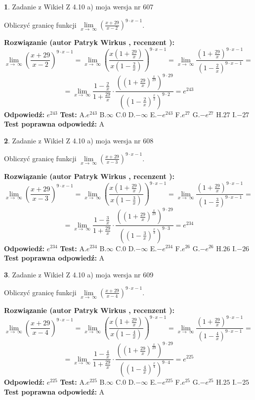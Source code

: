 \documentclass[12pt, a4paper]{article}
\theoremstyle{definition} %
\newtheorem{zad}{}
\newcommand{\zadStart}[1]{\begin{zad}#1\newline}
\newcommand{\zadStop}{\end{zad}}
\newcommand{\rozwStart}[2]{\noindent \textbf{Rozwiązanie (autor #1 , recenzent #2): }\newline}
\newcommand{\rozwStop}{\newline}
\newcommand{\odpStart}{\noindent \textbf{Odpowiedź:}\newline}
\newcommand{\odpStop}{\newline}
\newcommand{\testStart}{\noindent \textbf{Test:}\newline}
\newcommand{\testStop}{\newline}
\newcommand{\kluczStart}{\noindent \textbf{Test poprawna odpowiedź:}\newline}
\newcommand{\kluczStop}{\newline}
\begin{document}
\zadStart{Zadanie z Wikieł Z 4.10 a) moja wersja nr 607}

Obliczyć granicę funkcji  $\lim\limits_{x\to\ \infty}(\frac{x+29}{x-2})^{9\cdot x-1}$.
\zadStop
\rozwStart{Patryk Wirkus}{}
$$\lim\limits_{x\to\ \infty}(\frac{x+29}{x-2})^{9\cdot x-1} = \lim\limits_{x\to\ \infty}(\frac{x(1+\frac{29}{x})}{x(1-\frac{2}{x})})^{9\cdot x-1}=\lim\limits_{x\to\ \infty}\frac{(1+\frac{29}{x})^{9\cdot x-1}}{(1-\frac{2}{x})^{9\cdot x-1}}=$$
$$=\lim\limits_{x\to\ \infty}\frac{1-\frac{2}{x}}{1+\frac{29}{x}}\cdot\frac{((1+\frac{29}{x})^{\frac{x}{29}})^{9\cdot29}}{((1-\frac{2}{x})^{\frac{x}{2}})^{9\cdot2}}=e^{243}$$
\rozwStop
\odpStart
$e^{243}$
\odpStop
\testStart
A.$e^{243}$ B.$\infty$ C.$0$ D.$-\infty$ E.$-e^{243}$
F.$e^{27}$ G.$-e^{27}$
H.$27$
I.$-27$
\testStop
\kluczStart
A
\kluczStop



\zadStart{Zadanie z Wikieł Z 4.10 a) moja wersja nr 608}

Obliczyć granicę funkcji  $\lim\limits_{x\to\ \infty}(\frac{x+29}{x-3})^{9\cdot x-1}$.
\zadStop
\rozwStart{Patryk Wirkus}{}
$$\lim\limits_{x\to\ \infty}(\frac{x+29}{x-3})^{9\cdot x-1} = \lim\limits_{x\to\ \infty}(\frac{x(1+\frac{29}{x})}{x(1-\frac{3}{x})})^{9\cdot x-1}=\lim\limits_{x\to\ \infty}\frac{(1+\frac{29}{x})^{9\cdot x-1}}{(1-\frac{3}{x})^{9\cdot x-1}}=$$
$$=\lim\limits_{x\to\ \infty}\frac{1-\frac{3}{x}}{1+\frac{29}{x}}\cdot\frac{((1+\frac{29}{x})^{\frac{x}{29}})^{9\cdot29}}{((1-\frac{3}{x})^{\frac{x}{3}})^{9\cdot3}}=e^{234}$$
\rozwStop
\odpStart
$e^{234}$
\odpStop
\testStart
A.$e^{234}$ B.$\infty$ C.$0$ D.$-\infty$ E.$-e^{234}$
F.$e^{26}$ G.$-e^{26}$
H.$26$
I.$-26$
\testStop
\kluczStart
A
\kluczStop



\zadStart{Zadanie z Wikieł Z 4.10 a) moja wersja nr 609}

Obliczyć granicę funkcji  $\lim\limits_{x\to\ \infty}(\frac{x+29}{x-4})^{9\cdot x-1}$.
\zadStop
\rozwStart{Patryk Wirkus}{}
$$\lim\limits_{x\to\ \infty}(\frac{x+29}{x-4})^{9\cdot x-1} = \lim\limits_{x\to\ \infty}(\frac{x(1+\frac{29}{x})}{x(1-\frac{4}{x})})^{9\cdot x-1}=\lim\limits_{x\to\ \infty}\frac{(1+\frac{29}{x})^{9\cdot x-1}}{(1-\frac{4}{x})^{9\cdot x-1}}=$$
$$=\lim\limits_{x\to\ \infty}\frac{1-\frac{4}{x}}{1+\frac{29}{x}}\cdot\frac{((1+\frac{29}{x})^{\frac{x}{29}})^{9\cdot29}}{((1-\frac{4}{x})^{\frac{x}{4}})^{9\cdot4}}=e^{225}$$
\rozwStop
\odpStart
$e^{225}$
\odpStop
\testStart
A.$e^{225}$ B.$\infty$ C.$0$ D.$-\infty$ E.$-e^{225}$
F.$e^{25}$ G.$-e^{25}$
H.$25$
I.$-25$
\testStop
\kluczStart
A
\kluczStop
\end{document}
